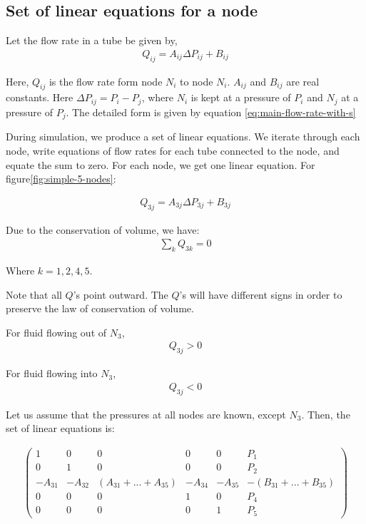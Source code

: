 \documentclass{crm-article}
\begin{document}
	\subsection{Set of linear equations for a node} \label{sec:linear-equ}
		
		Let the flow rate in a tube be given by,
		\begin{gather}  \label{eq:flow-rate-simple-coeff}
			Q_{ij} = A_{ij}\Delta P_{ij} + B_{ij}
		\end{gather}
		
		Here, $Q_{ij}$ is the flow rate form node $N_i$ to node $N_i$. $A_{ij}$ and $B_{ij}$ are real constants. Here $\Delta P_{ij} = P_i - P_j$, where $N_i$ is kept at a pressure of $P_i$ and $N_j$ at a pressure of $P_j$. The detailed form is given by equation \ref{eq:main-flow-rate-with-s}
		
		During simulation, we produce a set of linear equations. We iterate through each node, write equations of flow rates for each tube connected to the node, and equate the sum to zero. For each node, we get one linear equation. For figure\ref{fig:simple-5-nodes}:
		
		\begin{gather}
			Q_{3j} = A_{3j}\Delta P_{3j} + B_{3j}
		\end{gather}

		Due to the conservation of volume, we have:
		\begin{gather}
			\sum_{k} Q_{3k} = 0
		\end{gather}
		
		Where $k = {1, 2, 4, 5}$.
		
		Note that all $Q$'s point outward. The $Q$'s will have different signs in order to preserve the law of conservation of volume. 
		
		For fluid flowing out of $N_3$,
		\begin{gather}
			Q_{3j} > 0
		\end{gather}
		
		For fluid flowing into $N_3$,
		\begin{gather}
			Q_{3j} < 0
		\end{gather}
		
		Let us assume that the pressures at all nodes are known, except $N_3$. Then, the set of linear equations is:
		
		\begin{gather} \label{eq:matrix-open-sys-5-nodes}
			\begin{pmatrix}
				1 & 0 & 0 & 0 & 0 & P_{1}\\
				0 & 1 & 0 & 0 & 0 & P_{2}\\
				-A_{31} & -A_{32} & (A_{31} + ... + A_{35}) & -A_{34} & -A_{35} & -(B_{31} + ... + B_{35})\\
				0 & 0 & 0 & 1 & 0 & P_{4}\\
				0 & 0 & 0 & 0 & 1 & P_{5}
			\end{pmatrix}
		\end{gather}
		
\end{document}
